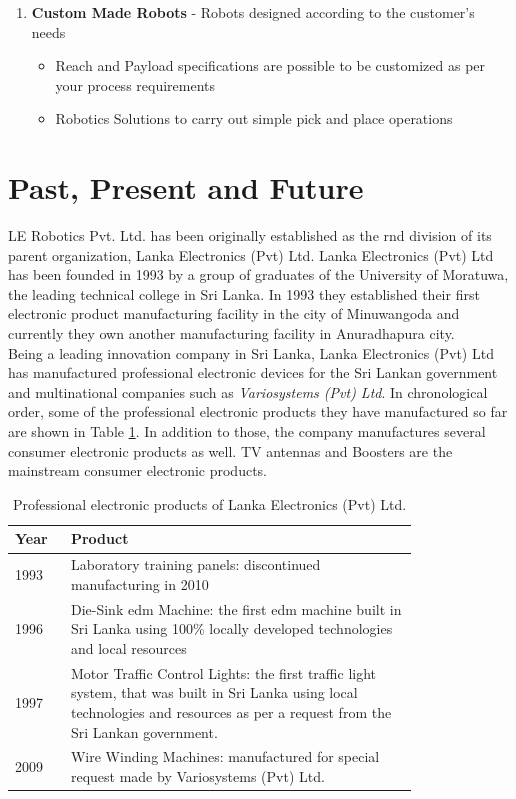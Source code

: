 \documentclass[a4paper,12pt]{report}
\begin{document}
\begin{enumerate}
	
	
	\item \textbf{Custom Made Robots} - Robots designed according to the customer's needs
	\begin{itemize}
		\item Reach and Payload specifications are possible to be customized as per your process requirements
		\item Robotics Solutions to carry out simple pick and place operations
	\end{itemize}
\end{enumerate}

\section{Past, Present and Future}
\label{Past Present and Future}
LE Robotics Pvt. Ltd. has been originally established as the \ac{rnd} division of its parent organization, Lanka Electronics (Pvt) Ltd. Lanka Electronics (Pvt) Ltd has been founded in 1993  by a group of graduates of the University of Moratuwa, the leading technical college in Sri Lanka. In 1993 they established their first electronic product manufacturing facility in the city of Minuwangoda and currently they own another manufacturing facility in Anuradhapura city.\\

Being a leading innovation company in Sri Lanka, Lanka Electronics (Pvt) Ltd has manufactured professional electronic devices for the Sri Lankan government and multinational companies such as \textit{Variosystems (Pvt) Ltd}. In chronological order, some of the professional electronic products they have manufactured so far are shown in Table \ref{table:pastproducts}. In addition to those, the company manufactures several consumer electronic products as well. TV antennas and Boosters are the mainstream consumer electronic products.

\begin{table}[h]
	\captionsetup{font=sc, labelsep=newline}
	\centering
	\caption{Professional electronic products of Lanka Electronics (Pvt) Ltd.}
	\begin{tabular}{|p{0.1\linewidth}  |p{0.7\linewidth}  |}
		\hline
		\textbf{Year} & \textbf{Product}\\\hline
		1993 & Laboratory training panels: discontinued manufacturing in 2010\\\hline
		1996 & Die-Sink \ac{edm} Machine: the first \ac{edm} machine built in Sri Lanka using 100\% locally developed technologies and local resources\\\hline
		1997& Motor Traffic Control Lights: the first traffic light system, that was built in Sri Lanka using local technologies and resources as per a request from the Sri Lankan government.\\\hline
		2009& Wire Winding Machines: manufactured for special request made by Variosystems (Pvt) Ltd.\\
		
		\hline
	\end{tabular}
	\label{table:pastproducts}
\end{table}
\end{document}
